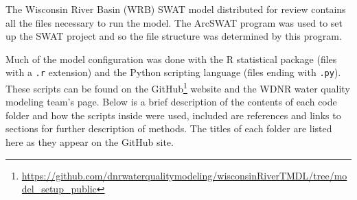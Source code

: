 \label{sec:model_data}
The Wisconsin River Basin (WRB) SWAT model distributed for review contains all the files necessary to run the model. The ArcSWAT program was used to set up the SWAT project and so the file structure was determined by this program. 

Much of the model configuration was done with the R statistical package (files with a \texttt{.r} extension) and the Python scripting language (files ending with \texttt{.py}). These scripts can be found on the GitHub\footnote{\url{https://github.com/dnrwaterqualitymodeling/wisconsinRiverTMDL/tree/model_setup_public}} website and the WDNR water quality modeling team's page. Below is a brief description of the contents of each code folder and how the scripts inside were used, included are references and links to sections for further description of methods. The titles of each folder are listed here as they appear on the GitHub site.

